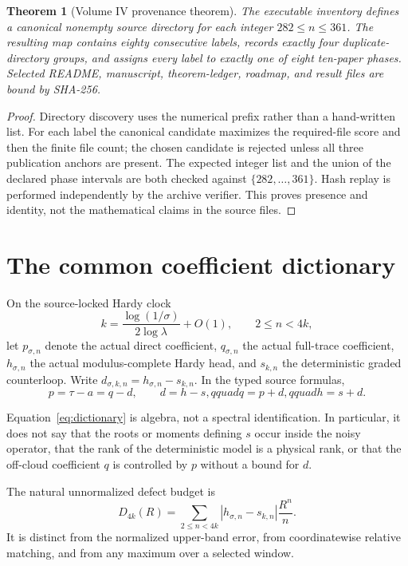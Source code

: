 \documentclass[11pt]{article}
\newtheorem{theorem}{Theorem}[section]
\theoremstyle{definition}
\theoremstyle{remark}
\begin{document}
\begin{theorem}[Volume IV provenance theorem]\label{thm:provenance}
The executable inventory defines a canonical nonempty source directory for
each integer $282\le n\le361$.  The resulting map contains eighty consecutive
labels, records exactly four duplicate-directory groups, and assigns every
label to exactly one of eight ten-paper phases.  Selected README, manuscript,
theorem-ledger, roadmap, and result files are bound by SHA-256.
\end{theorem}
\begin{proof}
Directory discovery uses the numerical prefix rather than a hand-written
list.  For each label the canonical candidate maximizes the required-file
score and then the finite file count; the chosen candidate is rejected unless
all three publication anchors are present.  The expected integer list and
the union of the declared phase intervals are both checked against
$\{282,\ldots,361\}$.  Hash replay is performed independently by the archive
verifier.  This proves presence and identity, not the mathematical claims in
the source files.
\end{proof}

\section{The common coefficient dictionary}

On the source-locked Hardy clock
\[
 k=\frac{\log(1/\sigma)}{2\log\lambda}+O(1),\qquad 2\le n<4k,
\]
let $p_{\sigma,n}$ denote the actual direct coefficient, $q_{\sigma,n}$ the
actual full-trace coefficient, $h_{\sigma,n}$ the actual modulus-complete
Hardy head, and $s_{k,n}$ the deterministic graded counterloop.  Write
$d_{\sigma,k,n}=h_{\sigma,n}-s_{k,n}$.  In the typed source formulas,
\begin{equation}\label{eq:dictionary}
 p=\tau-a=q-d,\qquad d=h-s,qquad q=p+d,qquad h=s+d.
\end{equation}

Equation~\eqref{eq:dictionary} is algebra, not a spectral identification.
In particular, it does not say that the roots or moments defining $s$ occur
inside the noisy operator, that the rank of the deterministic model is a
physical rank, or that the off-cloud coefficient $q$ is controlled by $p$
without a bound for $d$.

The natural unnormalized defect budget is
\begin{equation}\label{eq:defect}
 D_{4k}(R)=\sum_{2\le n<4k}
 |h_{\sigma,n}-s_{k,n}|\frac{R^n}{n}.
\end{equation}
It is distinct from the normalized upper-band error, from coordinatewise
relative matching, and from any maximum over a selected window.
\end{document}
